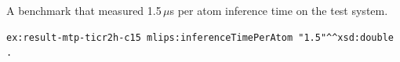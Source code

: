 A benchmark that measured 1.5\,$\mu$s per atom inference time on the
test system.
\begin{lstlisting}[language=turtle]
ex:result-mtp-ticr2h-c15 mlips:inferenceTimePerAtom "1.5"^^xsd:double .
\end{lstlisting}
